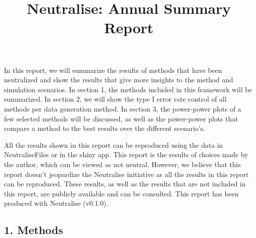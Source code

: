 \documentclass[
]{article}
\title{Neutralise: Annual Summary Report}
\author{}
\date{\vspace{-2.5em}}
\begin{document}
\maketitle

In this report, we will summarize the results of methods that have been
neutralized and show the results that give more insights to the method
and simulation scenarios. In section 1, the methods included in this
framework will be summarized. In section 2, we will show the type I
error rate control of all methods per data generation method. In section
3, the power-power plots of a few selected methods will be discussed, as
well as the power-power plots that compare a method to the best results
over the different scenario's.

All the results shown in this report can be reproduced using the data in
NeutraliseFiles or in the shiny app. This report is the results of
choices made by the author, which can be viewed as not neutral. However,
we believe that this report doesn't jeopardize the Neutralise initiative
as all the results in this report can be reproduced. These results, as
well as the results that are not included in this report, are publicly
available and can be consulted. This report has been produced with
Neutralise (v0.1.0).

\hypertarget{methods}{%
\subsection{1. Methods}\label{methods}}
\end{document}
